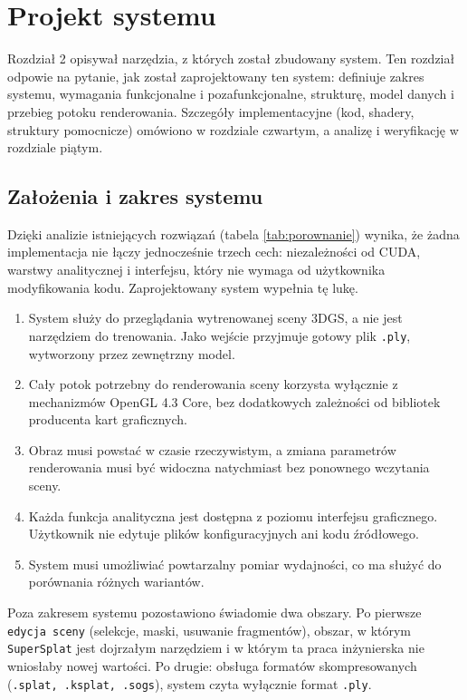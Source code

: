 \chapter{Projekt systemu}
\label{chap:projekt_systemu}
Rozdział 2 opisywał narzędzia, z których został zbudowany system. Ten rozdział odpowie na pytanie, jak został zaprojektowany ten system: definiuje zakres systemu, wymagania funkcjonalne i pozafunkcjonalne, strukturę, model danych i przebieg potoku renderowania. Szczegóły implementacyjne (kod, shadery, struktury pomocnicze) omówiono w rozdziale czwartym, a analizę i weryfikację w rozdziale piątym.

\section{Założenia i zakres systemu}
\label{sec:zalozenia}
Dzięki analizie istniejących rozwiązań (tabela \ref{tab:porownanie}) wynika, że żadna implementacja nie łączy jednocześnie trzech cech: niezależności od CUDA, warstwy analitycznej i interfejsu, który nie wymaga od użytkownika modyfikowania kodu. Zaprojektowany system wypełnia tę lukę.
\begin{enumerate}
    \item System służy do przeglądania wytrenowanej sceny 3DGS, a nie jest narzędziem do trenowania. Jako wejście przyjmuje gotowy plik \texttt{.ply}, wytworzony przez zewnętrzny model.
    \item Cały potok potrzebny do renderowania sceny korzysta wyłącznie z mechanizmów OpenGL 4.3 Core, bez dodatkowych zależności od bibliotek producenta kart graficznych.
    \item Obraz musi powstać w czasie rzeczywistym, a zmiana parametrów renderowania musi być widoczna natychmiast bez ponownego wczytania sceny.
    \item Każda funkcja analityczna jest dostępna z poziomu interfejsu graficznego. Użytkownik nie edytuje plików konfiguracyjnych ani kodu źródłowego.
    \item System musi umożliwiać powtarzalny pomiar wydajności, co ma służyć do porównania różnych wariantów.
\end{enumerate}
Poza zakresem systemu pozostawiono świadomie dwa obszary. Po pierwsze \texttt{edycja sceny} (selekcje, maski, usuwanie fragmentów), obszar, w którym \texttt{SuperSplat} jest dojrzałym narzędziem i w którym ta praca inżynierska nie wniosłaby nowej wartości. Po drugie: obsługa formatów skompresowanych (\texttt{.splat, .ksplat, .sogs}), system czyta wyłącznie format \texttt{.ply}.
